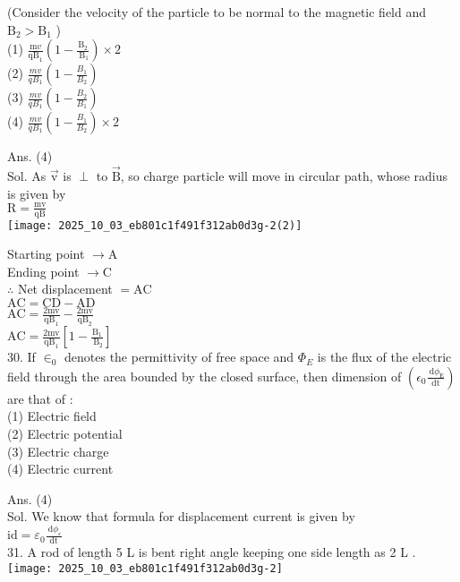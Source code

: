 \documentclass[10pt]{article}
\begin{document}
(Consider the velocity of the particle to be normal to the magnetic field and \(\mathrm{B}_{2}>\mathrm{B}_{1}\) )\\
(1) \(\frac{\mathrm{m} v}{\mathrm{qB}_{1}}\left(1-\frac{\mathrm{B}_{2}}{\mathrm{~B}_{1}}\right) \times 2\)\\
(2) \(\frac{m v}{q B_{1}}\left(1-\frac{B_{1}}{B_{2}}\right)\)\\
(3) \(\frac{m v}{q B_{1}}\left(1-\frac{B_{2}}{B_{1}}\right)\)\\
(4) \(\frac{m v}{q B_{1}}\left(1-\frac{B_{1}}{B_{2}}\right) \times 2\)

Ans. (4)\\
Sol. As \(\overrightarrow{\mathrm{v}}\) is \(\perp\) to \(\overrightarrow{\mathrm{B}}\), so charge particle will move in circular path, whose radius is given by\\
\(\mathrm{R}=\frac{\mathrm{mv}}{\mathrm{qB}}\)\\
\texttt{[image: 2025\_10\_03\_eb801c1f491f312ab0d3g-2(2)]}

Starting point \(\rightarrow \mathrm{A}\)\\
Ending point \(\rightarrow \mathrm{C}\)\\
\(\therefore\) Net displacement \(=\mathrm{AC}\)\\
\(\mathrm{AC}=\mathrm{CD}-\mathrm{AD}\)\\
\(\mathrm{AC}=\frac{2 \mathrm{mv}}{\mathrm{qB}_{1}}-\frac{2 \mathrm{mv}}{\mathrm{qB}_{2}}\)\\
\(\mathrm{AC}=\frac{2 \mathrm{mv}}{\mathrm{qB}_{1}}\left[1-\frac{\mathrm{B}_{1}}{\mathrm{~B}_{2}}\right]\)\\
30. If \(\in_{0}\) denotes the permittivity of free space and \(\Phi_{E}\) is the flux of the electric field through the area bounded by the closed surface, then dimension of \(\left(\epsilon_{0} \frac{\mathrm{~d} \phi_{\mathrm{E}}}{\mathrm{dt}}\right)\) are that of :\\
(1) Electric field\\
(2) Electric potential\\
(3) Electric charge\\
(4) Electric current

Ans. (4)\\
Sol. We know that formula for displacement current is given by\\
\(\mathrm{id}=\varepsilon_{0} \frac{\mathrm{~d} \phi_{\varepsilon}}{\mathrm{dt}}\)\\
31. A rod of length 5 L is bent right angle keeping one side length as 2 L .\\
\texttt{[image: 2025\_10\_03\_eb801c1f491f312ab0d3g-2]}
\end{document}
